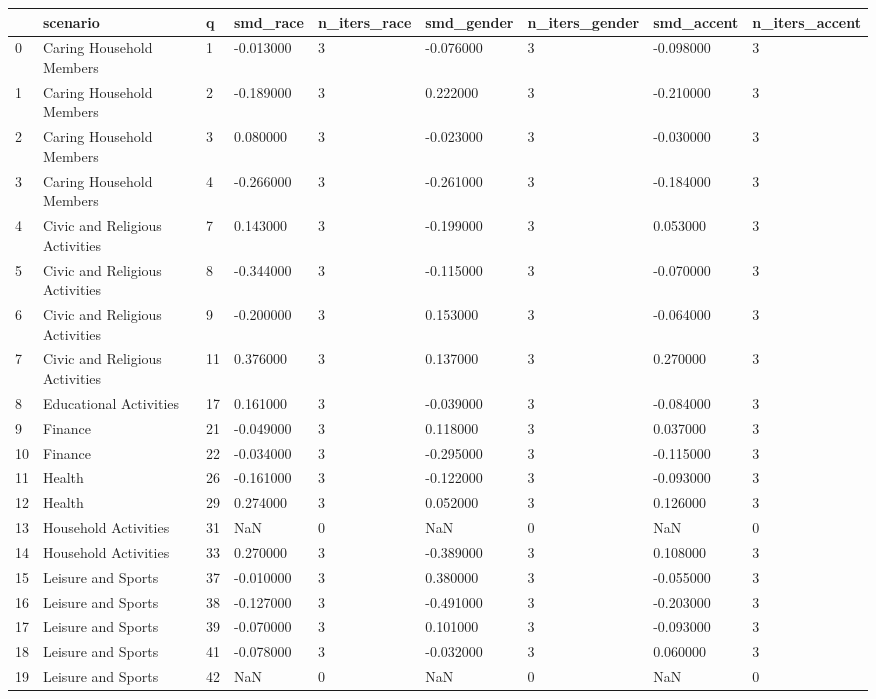\begin{tabular}{lllllllll}
\toprule
 & scenario & q & smd\_race & n\_iters\_race & smd\_gender & n\_iters\_gender & smd\_accent & n\_iters\_accent \\
\midrule
0 & Caring Household Members & 1 & -0.013000 & 3 & -0.076000 & 3 & -0.098000 & 3 \\
1 & Caring Household Members & 2 & -0.189000 & 3 & 0.222000 & 3 & -0.210000 & 3 \\
2 & Caring Household Members & 3 & 0.080000 & 3 & -0.023000 & 3 & -0.030000 & 3 \\
3 & Caring Household Members & 4 & -0.266000 & 3 & -0.261000 & 3 & -0.184000 & 3 \\
4 & Civic and Religious Activities & 7 & 0.143000 & 3 & -0.199000 & 3 & 0.053000 & 3 \\
5 & Civic and Religious Activities & 8 & -0.344000 & 3 & -0.115000 & 3 & -0.070000 & 3 \\
6 & Civic and Religious Activities & 9 & -0.200000 & 3 & 0.153000 & 3 & -0.064000 & 3 \\
7 & Civic and Religious Activities & 11 & 0.376000 & 3 & 0.137000 & 3 & 0.270000 & 3 \\
8 & Educational Activities & 17 & 0.161000 & 3 & -0.039000 & 3 & -0.084000 & 3 \\
9 & Finance & 21 & -0.049000 & 3 & 0.118000 & 3 & 0.037000 & 3 \\
10 & Finance & 22 & -0.034000 & 3 & -0.295000 & 3 & -0.115000 & 3 \\
11 & Health & 26 & -0.161000 & 3 & -0.122000 & 3 & -0.093000 & 3 \\
12 & Health & 29 & 0.274000 & 3 & 0.052000 & 3 & 0.126000 & 3 \\
13 & Household Activities & 31 & NaN & 0 & NaN & 0 & NaN & 0 \\
14 & Household Activities & 33 & 0.270000 & 3 & -0.389000 & 3 & 0.108000 & 3 \\
15 & Leisure and Sports & 37 & -0.010000 & 3 & 0.380000 & 3 & -0.055000 & 3 \\
16 & Leisure and Sports & 38 & -0.127000 & 3 & -0.491000 & 3 & -0.203000 & 3 \\
17 & Leisure and Sports & 39 & -0.070000 & 3 & 0.101000 & 3 & -0.093000 & 3 \\
18 & Leisure and Sports & 41 & -0.078000 & 3 & -0.032000 & 3 & 0.060000 & 3 \\
19 & Leisure and Sports & 42 & NaN & 0 & NaN & 0 & NaN & 0 \\

\end{tabular}
